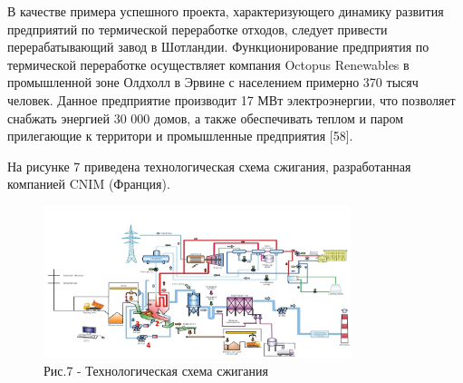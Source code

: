 \begin{multicols}{2}
В качестве примера успешного проекта, характеризующего динамику развития
предприятий по термической переработке отходов, следует привести
перерабатывающий завод в Шотландии. Функционирование предприятия по
термической переработке осуществляет компания Octopus Renewables в
промышленной зоне Олдхолл в Эрвине с населением примерно 370 тысяч
человек. Данное предприятие производит 17 МВт электроэнергии, что
позволяет снабжать энергией 30 000 домов, а также обеспечивать теплом и
паром прилегающие к территори и промышленные предприятия {[}58{]}.

На рисунке 7 приведена технологическая схема сжигания, разработанная
компанией CNIM (Франция).
\end{multicols}

\begin{figure}[H]
	\centering
	\includegraphics[width=0.8\textwidth]{media/chem2/image70}
	\caption*{Рис.7 - Технологическая схема сжигания}
\end{figure}

